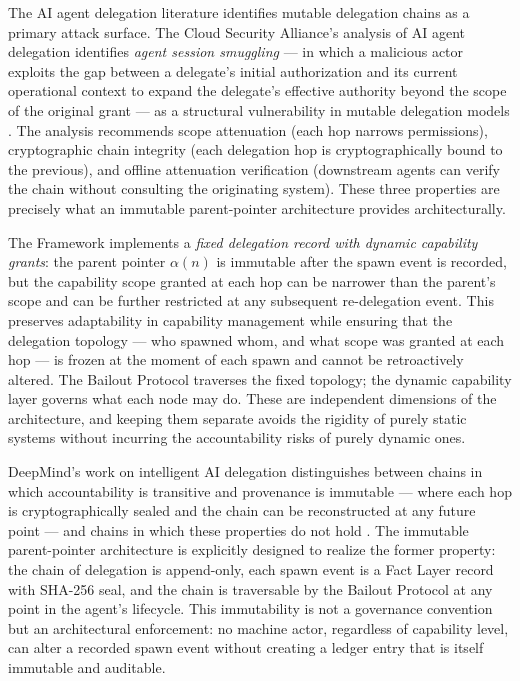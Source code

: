 The AI agent delegation literature identifies mutable delegation chains as a primary attack surface. The Cloud Security Alliance's analysis of AI agent delegation identifies \emph{agent session smuggling} — in which a malicious actor exploits the gap between a delegate's initial authorization and its current operational context to expand the delegate's effective authority beyond the scope of the original grant — as a structural vulnerability in mutable delegation models \cite{csa-delegation}. The analysis recommends scope attenuation (each hop narrows permissions), cryptographic chain integrity (each delegation hop is cryptographically bound to the previous), and offline attenuation verification (downstream agents can verify the chain without consulting the originating system). These three properties are precisely what an immutable parent-pointer architecture provides architecturally.

The \bxthree{} Framework implements a \emph{fixed delegation record with dynamic capability grants}: the parent pointer $\alpha(n)$ is immutable after the spawn event is recorded, but the capability scope granted at each hop can be narrower than the parent's scope and can be further restricted at any subsequent re-delegation event. This preserves adaptability in capability management while ensuring that the delegation topology — who spawned whom, and what scope was granted at each hop — is frozen at the moment of each spawn and cannot be retroactively altered. The Bailout Protocol traverses the fixed topology; the dynamic capability layer governs what each node may do. These are independent dimensions of the architecture, and keeping them separate avoids the rigidity of purely static systems without incurring the accountability risks of purely dynamic ones.

DeepMind's work on intelligent AI delegation distinguishes between chains in which accountability is transitive and provenance is immutable — where each hop is cryptographically sealed and the chain can be reconstructed at any future point — and chains in which these properties do not hold \cite{deepmind-delegation}. The \bxthree{} immutable parent-pointer architecture is explicitly designed to realize the former property: the chain of delegation is append-only, each spawn event is a Fact Layer record with SHA-256 seal, and the chain is traversable by the Bailout Protocol at any point in the agent's lifecycle. This immutability is not a governance convention but an architectural enforcement: no machine actor, regardless of capability level, can alter a recorded spawn event without creating a ledger entry that is itself immutable and auditable.

